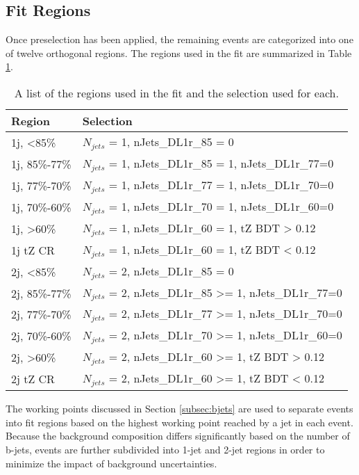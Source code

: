 \subsection{Fit Regions}
\label{subsec:regions}

Once preselection has been applied, the remaining events are categorized into one of twelve orthogonal regions. The regions used in the fit are summarized in Table \ref{tab:regions}.

\begin{table}[H] 
\centering
\caption{A list of the regions used in the fit and the selection used for each.}
\begin{tabular}{l|l}
\hline\hline
Region & Selection            \\
\hline
\hline
1j, <85\%       & $N_{jets}$ = 1, nJets\_DL1r\_85 = 0            \\
1j, 85\%-77\%   & $N_{jets}$ = 1, nJets\_DL1r\_85 = 1, nJets\_DL1r\_77=0                     \\
1j, 77\%-70\%   & $N_{jets}$ = 1, nJets\_DL1r\_77 = 1, nJets\_DL1r\_70=0                     \\
1j, 70\%-60\%   & $N_{jets}$ = 1, nJets\_DL1r\_70 = 1, nJets\_DL1r\_60=0                      \\
1j, >60\%       & $N_{jets}$ = 1, nJets\_DL1r\_60 = 1, tZ BDT > 0.12 \\
1j tZ CR        & $N_{jets}$ = 1, nJets\_DL1r\_60 = 1, tZ BDT < 0.12 \\
2j, <85\%       & $N_{jets}$ = 2, nJets\_DL1r\_85 = 0                    \\
2j, 85\%-77\%   & $N_{jets}$ = 2, nJets\_DL1r\_85 >= 1, nJets\_DL1r\_77=0                     \\
2j, 77\%-70\%   & $N_{jets}$ = 2, nJets\_DL1r\_77 >= 1, nJets\_DL1r\_70=0                     \\
2j, 70\%-60\%   & $N_{jets}$ = 2, nJets\_DL1r\_70 >= 1, nJets\_DL1r\_60=0                      \\
2j, >60\%       & $N_{jets}$ = 2, nJets\_DL1r\_60 >= 1, tZ BDT > 0.12 \\
2j tZ CR        & $N_{jets}$ = 2, nJets\_DL1r\_60 >= 1, tZ BDT < 0.12 \\
\hline\hline
\end{tabular}
\label{tab:regions}
\end{table}

The working points discussed in Section \ref{subsec:bjets} are used to separate events into fit regions based on the highest working point reached by a jet in each event. Because the background composition differs significantly based on the number of b-jets, events are further subdivided into 1-jet and 2-jet regions in order to minimize the impact of background uncertainties.


